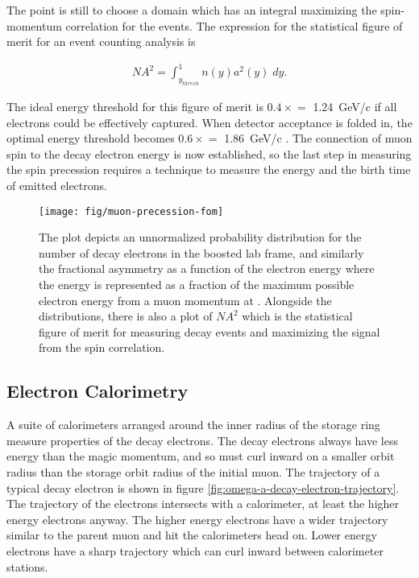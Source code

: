 \noindent
The point is still to choose a domain which has an integral maximizing the spin-momentum correlation for the events.  The expression for the statistical figure of merit for an event counting analysis is

\begin{align}
\label{eqn:expt-figure-of-merit}
NA^2 = \int_{y_{thresh}}^{1} n(y) a^2(y) \;dy.
\end{align}

\noindent
The ideal energy threshold for this figure of merit is $0.4\times$\pmagic$ = $ \SI{1.24}{\GeV/c} if all electrons could be effectively captured.  When detector acceptance is folded in, the optimal energy threshold becomes $0.6\times$\pmagic$ = $ \SI{1.86}{\GeV/c} \cite{e989-tdr}.  The connection of muon spin to the decay electron energy is now established, so the last step in measuring the spin precession requires a technique to measure the energy and the birth time of emitted electrons. \cite{e821-prd}

\begin{figure}
\centering
\texttt{[image: fig/muon-precession-fom]}
\caption{The plot depicts an unnormalized probability distribution for the number of decay electrons in the boosted lab frame, and similarly the fractional asymmetry as a function of the electron energy where the energy is represented as a fraction of the maximum possible electron energy from a muon momentum at \pmagic. Alongside the distributions, there is also a plot of $NA^2$ which is the statistical figure of merit for measuring decay events and maximizing the signal from the spin correlation. \label{fig:muon-precession-fom}}
\end{figure}

\subsection{Electron Calorimetry}

A suite of calorimeters arranged around the inner radius of the storage ring measure properties of the decay electrons.  The decay electrons always have less energy than the magic momentum, and so must curl inward on a smaller orbit radius than the storage orbit radius of the initial muon.  The trajectory of a typical decay electron is shown in figure \ref{fig:omega-a-decay-electron-trajectory}.  The trajectory of the electrons intersects with a calorimeter, at least the higher energy electrons anyway. The higher energy electrons have a wider trajectory similar to the parent muon and hit the calorimeters head on.  Lower energy electrons have a sharp trajectory which can curl inward between calorimeter stations.

